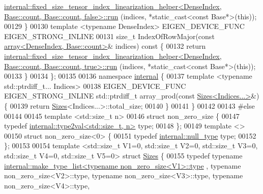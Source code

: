 \begin{DoxyCode}
      \hyperlink{struct_eigen_1_1internal_1_1fixed__size__tensor__index__linearization__helper}{internal::fixed\_size\_tensor\_index\_linearization\_helper<DenseIndex, Base::count, Base::count, false>::run}
      (indices, *static\_cast<const Base*>(\textcolor{keyword}{this}));
00129   \}
00130   \textcolor{keyword}{template} <\textcolor{keyword}{typename} DenseIndex> EIGEN\_DEVICE\_FUNC EIGEN\_STRONG\_INLINE
00131   \textcolor{keywordtype}{size\_t} IndexOfRowMajor(\textcolor{keyword}{const} \hyperlink{class_eigen_1_1array}{array<DenseIndex, Base::count>}& indices)\textcolor{keyword}{ const
       }\{
00132     \textcolor{keywordflow}{return} 
      \hyperlink{struct_eigen_1_1internal_1_1fixed__size__tensor__index__linearization__helper}{internal::fixed\_size\_tensor\_index\_linearization\_helper<DenseIndex, Base::count, Base::count, true>::run}
      (indices, *static\_cast<const Base*>(\textcolor{keyword}{this}));
00133   \}
00134 \};
00135 
00136 \textcolor{keyword}{namespace }\hyperlink{namespaceinternal}{internal} \{
00137 \textcolor{keyword}{template} <\textcolor{keyword}{typename} std::ptrdiff\_t... Indices>
00138 EIGEN\_DEVICE\_FUNC EIGEN\_STRONG\_INLINE std::ptrdiff\_t array\_prod(\textcolor{keyword}{const} 
      \hyperlink{struct_eigen_1_1_sizes}{Sizes<Indices...>}&) \{
00139   \textcolor{keywordflow}{return} \hyperlink{struct_eigen_1_1_sizes}{Sizes}<Indices...>::total\_size;
00140 \}
00141 \}
00142 
00143 \textcolor{preprocessor}{#else}
00144 
00145 \textcolor{keyword}{template} <std::\textcolor{keywordtype}{size\_t} n>
00146 \textcolor{keyword}{struct }non\_zero\_size \{
00147   \textcolor{keyword}{typedef} \hyperlink{struct_eigen_1_1internal_1_1type2val}{internal::type2val<std::size\_t, n>} type;
00148 \};
00149 \textcolor{keyword}{template} <>
00150 \textcolor{keyword}{struct }non\_zero\_size<0> \{
00151   \textcolor{keyword}{typedef} \hyperlink{struct_eigen_1_1internal_1_1null__type}{internal::null\_type} type;
00152 \};
00153 
00154 \textcolor{keyword}{template} <std::\textcolor{keywordtype}{size\_t} V1=0, std::\textcolor{keywordtype}{size\_t} V2=0, std::\textcolor{keywordtype}{size\_t} V3=0, std::\textcolor{keywordtype}{size\_t} V4=0, std::\textcolor{keywordtype}{size\_t} V5=0> \textcolor{keyword}{struct }
      \hyperlink{struct_eigen_1_1_sizes}{Sizes} \{
00155   \textcolor{keyword}{typedef} \textcolor{keyword}{typename} \hyperlink{struct_eigen_1_1internal_1_1make__type__list}{internal::make\_type\_list<typename non\_zero\_size<V1>::type}
      , \textcolor{keyword}{typename} non\_zero\_size<V2>::type, \textcolor{keyword}{typename} non\_zero\_size<V3>::type, \textcolor{keyword}{typename} non\_zero\_size<V4>::type, \textcolor{keyword}{
}
\end{DoxyCode}
